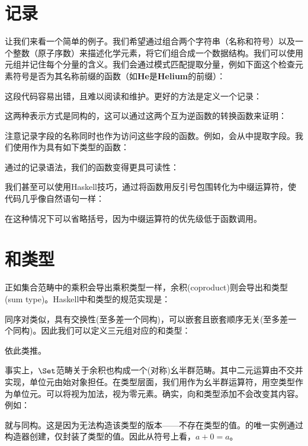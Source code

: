 \section{记录}

让我们来看一个简单的例子。我们希望通过组合两个字符串（名称和符号）以及一个整数（原子序数）来描述化学元素，将它们组合成一个数据结构。我们可以使用元组并记住每个分量的含义。我们会通过模式匹配提取分量，例如下面这个检查元素符号是否为其名称前缀的函数（如\textbf{He}是\textbf{Helium}的前缀）：

这段代码容易出错，且难以阅读和维护。更好的方法是定义一个记录：

这两种表示方式是同构的，这可以通过这两个互为逆函数的转换函数来证明：


注意记录字段的名称同时也作为访问这些字段的函数。例如，会从中提取字段。我们使用作为具有如下类型的函数：

通过的记录语法，我们的函数变得更具可读性：

我们甚至可以使用Haskell技巧，通过将函数用反引号包围转化为中缀运算符，使代码几乎像自然语句一样：

在这种情况下可以省略括号，因为中缀运算符的优先级低于函数调用。

\section{和类型}

正如集合范畴中的乘积会导出乘积类型一样，余积(coproduct)则会导出和类型(sum type)。Haskell中和类型的规范实现是：

同序对类似，具有交换性(至多差一个同构)，可以嵌套且嵌套顺序无关(至多差一个同构)。因此我们可以定义三元组对应的和类型：

依此类推。

事实上，$\Set$范畴关于余积也构成一个(对称)幺半群范畴。其中二元运算由不交并实现，单位元由始对象担任。在类型层面，我们用作为幺半群运算符，用空类型作为单位元。可以将视为加法，视为零元素。确实，向和类型添加不会改变其内容。例如：

就与同构。这是因为无法构造该类型的版本——不存在类型的值。的唯一实例通过构造器创建，仅封装了类型的值。因此从符号上看，$a + 0 = a$。

